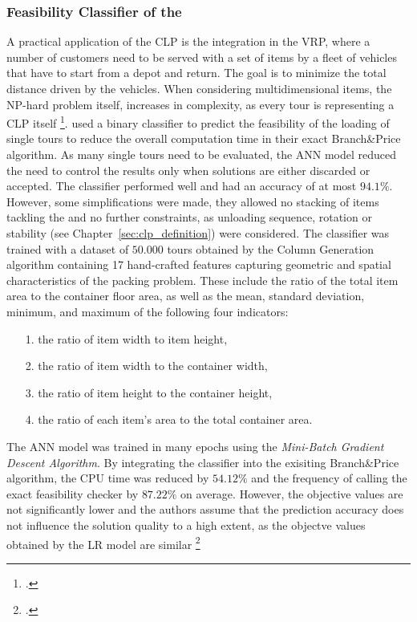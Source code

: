\subsubsection{Feasibility Classifier of the }
A practical application of the \gls{CLP} is the integration in the \gls{VRP}, where
a number of customers need to be served with a set of items by a fleet of vehicles that have
to start from a depot and return. The goal is to minimize the total distance driven
by the vehicles. When considering multidimensional items, the NP-hard problem itself,
increases in complexity, as every tour is representing a \gls{CLP} itself \footcite[cf.][pp. 1--2]{tamke_branch-and-cut_2024}.
\citeauthor*{zhang_learning-based_2022} used a binary classifier to predict the feasibility of the
loading of single tours to reduce the overall computation time in their exact Branch\&Price
algorithm. As many single tours need to be evaluated, the \gls{ANN} model reduced the need
to control the results only when solutions are either discarded or accepted. The classifier
performed well and had an accuracy of at most $94.1\%$. However, some simplifications were made,
they allowed no stacking of items tackling the  and no further constraints,
as unloading sequence, rotation or stability (see Chapter~\ref{sec:clp_definition}) were considered.
The classifier was trained with a dataset of $50.000$ tours obtained by the Column Generation
algorithm containing 17 hand-crafted features capturing geometric
and spatial characteristics of the packing problem. These include the ratio of the total item area
to the container floor area, as well as the mean, standard deviation, minimum, and maximum of
the following four indicators:
\begin{itemize}
    \item[1.] the ratio of item width to item height,
    \item[2.] the ratio of item width to the container width,
    \item[3.] the ratio of item height to the container height,
    \item[4.] the ratio of each item’s area to the total container area.
\end{itemize}
The \gls{ANN} model was trained in many epochs
using the \textit{Mini-Batch Gradient Descent Algorithm}. By integrating the classifier into the
exisiting Branch\&Price algorithm, the CPU time was reduced by $54.12\%$ and the frequency of
calling the exact feasibility checker by $87.22\%$ on average. However, the objective values are not significantly
lower and the authors assume that the prediction accuracy does not influence the solution quality
to a high extent, as the objectve values obtained by the \gls{LR} model are similar \footcite[cf.][pp. 4, 9--15]{zhang_learning-based_2022}

